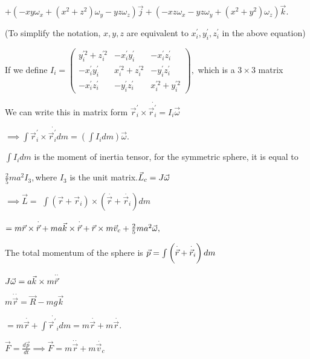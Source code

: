 \documentclass{article}
\begin{document}
$+\left( -xy\omega _{x}+\left( x^{2}+z^{2}\right) \omega _{y}-yz\omega
_{z}\right) \vec{j}+\left( -xz\omega _{x}-yz\omega _{y}+\left(
x^{2}+y^{2}\right) \omega _{z}\right) \vec{k}.$

(To simplify the notation, $x,y,z$ are equivalent to $x_{i}^{\prime
},y_{i}^{\prime },z_{i}^{\prime }$ in the above equation)

\bigskip If we define $I_{i}=%
\begin{pmatrix}
y_{i}^{\prime 2}+z_{i}^{\prime 2} & -x_{i}^{\prime }y_{i}^{\prime } & 
-x_{i}^{\prime }z_{i}^{\prime } \\ 
-x_{i}^{\prime }y_{i}^{\prime } & x_{i}^{\prime 2}+z_{i}^{\prime 2} & 
-y_{i}^{\prime }z_{i}^{\prime } \\ 
-x_{i}^{\prime }z_{i}^{\prime } & -y_{i}^{\prime }z_{i}^{\prime } & 
x_{i}^{\prime 2}+y_{i}^{\prime 2}%
\end{pmatrix}%
,$ which is a $3\times 3$ matrix

We can write this in matrix form $\vec{r}_{i}^{\prime }\times \overset{\cdot 
}{\vec{r}_{i}^{\prime }}=I_{i}\vec{\omega}$

$\implies \int \vec{r}_{i}^{\prime }\times \overset{\cdot }{\vec{r}%
_{i}^{\prime }}dm=\left( \int I_{i}dm\right) \vec{\omega}.$

$\int I_{i}dm$ is the moment of inertia tensor, for the symmetric sphere, it
is equal to

$\frac{2}{5}ma^{2}I_{3},$where $I_{3}$ is the unit matrix.$\vec{L}_{c}=J\vec{%
\omega}$

$\implies \vec{L}=$ $\int \left( \vec{r}+\vec{r}_{i}\right) \times \left( 
\overset{\cdot }{\vec{r}}+\overset{\cdot }{\vec{r}}_{i}\right) dm$

$=m\vec{r}\times \overset{\cdot }{\vec{r}}+ma\vec{k}\times \overset{\cdot }{%
\vec{r}}+\vec{r}\times m\vec{v}_{c}+\frac{2}{5}ma^{2}\vec{\omega},$

\bigskip The total momentum of the sphere is $\vec{p}=\int \left( \overset{%
\cdot }{\vec{r}}+\overset{\cdot }{\vec{r}}_{i}\right) dm$

$\bigskip J\vec{\omega}=a\vec{k}\times m\overset{\cdot \cdot }{\vec{r}}$

$m\overset{\cdot \cdot }{\vec{r}}=\vec{R}-mg\vec{k}$

$=m\overset{\cdot }{\vec{r}}+\int \overset{\cdot }{\vec{r}^{\prime }}_{i}dm=m%
\overset{\cdot }{\vec{r}}+m\overset{\cdot }{\vec{r}}.$

$\vec{F}=\frac{d\vec{p}}{dt}\implies \vec{F}=m\overset{\cdot \cdot }{\vec{r}}%
+m\overset{\cdot }{\vec{v}}_{c}$
\end{document}
